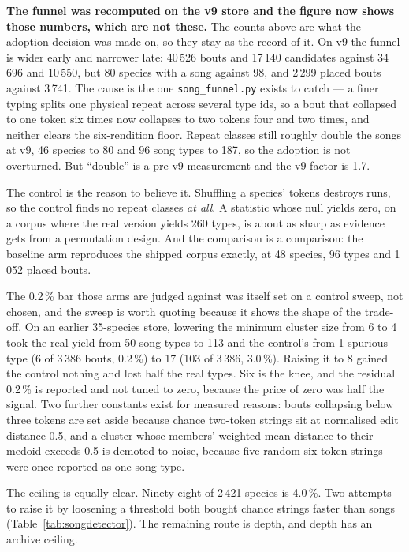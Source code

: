 \documentclass[10pt,twocolumn,a4paper]{article}
\begin{document}
\textbf{The funnel was recomputed on the v9 store and the figure now shows those numbers,
which are not these.} The counts above are what the adoption decision was made on, so they
stay as the record of it. On v9 the funnel is wider early and narrower late: 40\,526 bouts and
17\,140 candidates against 34\,696 and 10\,550, but 80 species with a song against 98, and
2\,299 placed bouts against 3\,741. The cause is the one \texttt{song\_funnel.py} exists to
catch --- a finer typing splits one physical repeat across several type ids, so a bout that
collapsed to one token six times now collapses to two tokens four and two times, and neither
clears the six-rendition floor. Repeat classes still roughly double the songs at v9, 46 species
to 80 and 96 song types to 187, so the adoption is not overturned. But ``double'' is a
pre-v9 measurement and the v9 factor is 1.7.

The control is the reason to believe it. Shuffling a species' tokens destroys runs, so the
control finds no repeat classes \emph{at all}. A statistic whose null yields zero, on a
corpus where the real version yields 260 types, is about as sharp as evidence gets from a
permutation design. And the comparison is a comparison: the baseline arm reproduces the
shipped corpus exactly, at 48 species, 96 types and 1\,052 placed bouts.

The 0.2\,\% bar those arms are judged against was itself set on a control sweep, not chosen, and the sweep is worth quoting because it shows the shape of the trade-off. On an
earlier 35-species store, lowering the minimum cluster size from 6 to 4 took the real yield
from 50 song types to 113 and the control's from 1 spurious type (6 of 3\,386 bouts, 0.2\,\%)
to 17 (103 of 3\,386, 3.0\,\%). Raising it to 8 gained the control nothing and lost half the
real types. Six is the knee, and the residual 0.2\,\% is reported and not tuned to zero,
because the price of zero was half the signal. Two further constants exist for measured
reasons: bouts collapsing below three tokens are set aside because chance two-token strings
sit at normalised edit distance 0.5, and a cluster whose members' weighted mean distance to
their medoid exceeds 0.5 is demoted to noise, because five random six-token strings were once
reported as one song type.

The ceiling is equally clear. Ninety-eight of 2\,421 species is 4.0\,\%. Two attempts to
raise it by loosening a threshold both bought chance strings faster than songs
(Table~\ref{tab:songdetector}). The remaining route is depth, and depth has an archive
ceiling.
\end{document}
